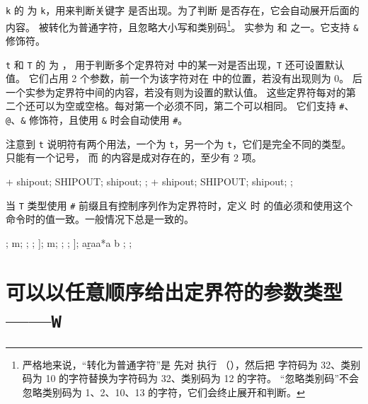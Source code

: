 \documentclass[openany]{book}
\begin{document}
\texttt k 的  为 \verb|k|，用来判断关键字 
是否出现。为了判断  是否存在，它会自动展开后面的内容。
 被转化为普通字符，且忽略大小写和类别码\footnote{严格地来说，“转化为普通字符”是
先对  执行 （），然后把
字符码为 32、类别码为 10 的字符替换为字符码为 32、类别码为 12 的字符。
“忽略类别码”不会忽略类别码为 1、2、10、13 的字符，它们会终止展开和判断。}。
实参为  和  之一。它支持 \texttt\& 修饰符。

\texttt t 和 \texttt T 的  为 ，
用于判断多个定界符对  中的某一对是否出现，\texttt T 还可设置默认值。
它们占用 2 个参数，前一个为该字符对在  中的位置，若没有出现则为 0。
后一个实参为定界符中间的内容，若没有则为设置的默认值。
这些定界符每对的第二个还可以为空或空格。每对第一个必须不同，第二个可以相同。
它们支持 \texttt\#、\texttt @、\texttt\& 修饰符，且使用 \texttt\& 时会自动使用 \texttt\#。

注意到 \texttt t 说明符有两个用法，一个为 \verb|t|，另一个为 
\verb|t|，它们是完全不同的类型。 只能有一个记号，
而  的内容是成对存在的，至少有 2 项。

\begin{examcode}{}
\DeclareEKeysCommand {} {\detokenize{[#1|#2]}}
\DeclareEKeysCommand {}
\ttfamily\obeylines
\def\ipout{ipout}
\faa + shipout; \faa * SHIPOUT; \faa sh\ipout; \faa ;
\fbb + shipout; \fbb * SHIPOUT; \fbb sh\ipout; \fbb ;
\end{examcode}

当 \texttt T 类型使用 \texttt\# 前缀且有控制序列作为定界符时，定义  时 
 的值必须和使用这个  命令时的值一致。一般情况下总是一致的。

\begin{examcode}{}
\DeclareEKeysCommand {} {}
\DeclareEKeysCommand {} {}
\DeclareEKeysCommand {} {}
\ttfamily\obeylines
\faa [{bracket[b]}]; \faa * m; ; \faa ;
\fbb [bracket[b]];   \fbb * m; ; \fbb ;
\fcc [bracket[b]];   \fcc \a a\a r\b\b \fcc *aa*a b ; \fcc ;
\end{examcode}

\section{可以以任意顺序给出定界符的参数类型——\texttt W}
\end{document}
